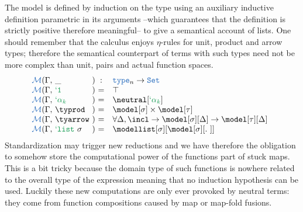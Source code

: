 \documentclass[preprint]{sigplanconf}
\begin{document}
\begin{definition}[Model] The model is defined by induction on the type using an auxiliary
inductive definition parametric in its arguments --which guarantees that the
definition is strictly positive therefore meaningful-- to give a semantical account
of lists. One should remember that the calculus enjoys $\eta$-rules for unit,
product and arrow types; therefore the semantical counterpart of terms with such
types need not be more complex than unit, pairs and actual function spaces.
$$\begin{array}{@{\NBE(\Gamma,~}l@{~)~}cl}
  \_ & : & \type \rightarrow \set \\
  \tyunit  & = & \top\\
  \tybase  & = & \neutral[\tybase]\\
  \typrod  & = & \model[\sigma] \times \model[\tau]\\
  \tyarrow & = & \forall \Delta, \incl \rightarrow \model[\sigma][\Delta] \rightarrow \model[\tau][\Delta]\\
  \tylist  & = & \modellist[\sigma][\modellistfun]\\
\end{array}$$
Standardization may trigger new reductions and we have therefore the obligation
to somehow store the computational power of the functions part of stuck maps. This
is a bit tricky because the domain type of such functions is nowhere related to
the overall type of the expression meaning that no induction hypothesis can be used.
Luckily these new computations are only ever provoked by neutral terms: they come
from function compositions caused by map or map-fold fusions.
\end{definition}
\end{document}
